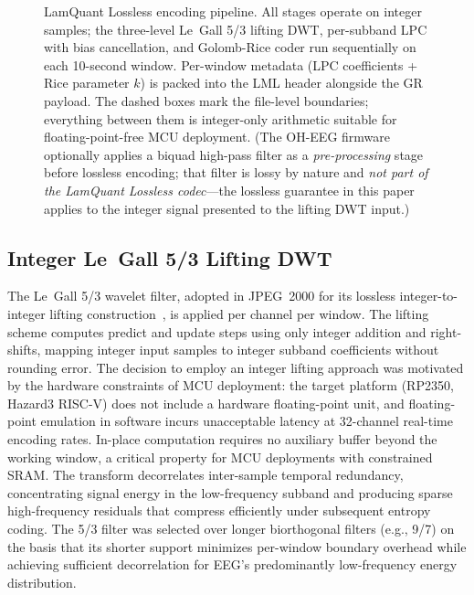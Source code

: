 \documentclass[journal]{IEEEtran}
\begin{document}
\begin{figure}[!t]
\caption{LamQuant Lossless encoding pipeline. All stages operate
on integer samples; the three-level Le~Gall 5/3 lifting DWT,
per-subband LPC with bias cancellation, and Golomb-Rice coder run
sequentially on each 10-second window. Per-window metadata (LPC
coefficients + Rice parameter $k$) is packed into the LML header
alongside the GR payload. The dashed boxes mark the file-level
boundaries; everything between them is integer-only arithmetic
suitable for floating-point-free MCU deployment. (The OH-EEG
firmware optionally applies a biquad high-pass filter as a
\emph{pre-processing} stage before lossless encoding; that filter
is lossy by nature and \emph{not part of the LamQuant Lossless
codec}---the lossless guarantee in this paper applies to the
integer signal presented to the lifting DWT input.)}
\label{fig:pipeline}
\end{figure}

\subsection{Integer Le~Gall 5/3 Lifting DWT}
The Le~Gall 5/3 wavelet filter, adopted in JPEG~2000 for its
lossless integer-to-integer lifting
construction~\cite{sweldens1996,itu_t800}, is applied per channel per window.
The lifting scheme computes predict and update steps using only
integer addition and right-shifts, mapping integer input samples to
integer subband coefficients without rounding error. The decision to
employ an integer lifting approach was motivated by the hardware
constraints of MCU deployment: the target platform (RP2350, Hazard3
RISC-V) does not include a hardware floating-point unit, and
floating-point emulation in software incurs unacceptable latency at
32-channel real-time encoding rates. In-place computation requires no
auxiliary buffer beyond the working window, a critical property for
MCU deployments with constrained SRAM. The transform decorrelates
inter-sample temporal redundancy, concentrating signal energy in the
low-frequency subband and producing sparse high-frequency residuals
that compress efficiently under subsequent entropy coding. The 5/3
filter was selected over longer biorthogonal filters (e.g., 9/7) on
the basis that its shorter support minimizes per-window boundary
overhead while achieving sufficient decorrelation for EEG's
predominantly low-frequency energy distribution.
\end{document}
